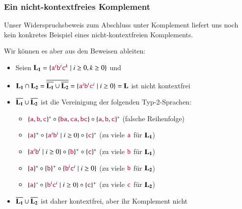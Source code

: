 \documentclass[aspectratio=1610,onlymath]{beamer}
\begin{document}
\begin{frame}\frametitle{Ein nicht-kontextfreies Komplement}

Unser Widerspruchsbeweis zum Abschluss unter Komplement liefert uns noch kein 
konkretes Beispiel eines nicht-kontextfreien Komplements.\pause
\medskip

Wir können es aber aus den Beweisen ableiten:
\begin{itemize}
\item Seien $\Slangsub{L}{1}=\{\Sterm{a}^i\Sterm{b}^i\Sterm{c}^k\mid i\geq 0, k\geq 0\}$ 
und 
%
\item $\Slangsub{L}{1}\cap\Slangsub{L}{2}=\overline{\overline{\Slangsub{L}{1}}\cup\overline{\Slangsub{L}{2}}}=\{\Sterm{a}^i\Sterm{b}^i\Sterm{c}^i\mid i\geq 0\}=\Slang{L}$ ist nicht kontextfrei\pause
%
\item $\overline{\Slangsub{L}{1}}\cup\overline{\Slangsub{L}{2}}$ ist die Vereinigung der folgenden Typ-2-Sprachen:
\begin{itemize}
\item $\{\Sterm{a},\Sterm{b},\Sterm{c}\}^*\circ\{\Sterm{ba},\Sterm{ca},\Sterm{bc}\}\circ\{\Sterm{a},\Sterm{b},\Sterm{c}\}^*$ (falsche Reihenfolge)
\item $\{\Sterm{a}\}^+\circ \{\Sterm{a}^i\Sterm{b}^i\mid i\geq 0\}\circ\{\Sterm{c}\}^*$ \hspace{1.25cm}(zu viele $\Sterm{a}$ für $\Slangsub{L}{1}$)
\item $\{\Sterm{a}^i\Sterm{b}^i\mid i\geq 0\}\circ\{\Sterm{b}\}^+\circ\{\Sterm{c}\}^*$ \hspace{1.25cm}(zu viele $\Sterm{b}$ für $\Slangsub{L}{1}$)
\item $\{\Sterm{a}\}^*\circ\{\Sterm{b}\}^+\circ \{\Sterm{b}^i\Sterm{c}^i\mid i\geq 0\}$ \hspace{1.25cm}(zu viele $\Sterm{b}$ für $\Slangsub{L}{2}$)
\item $\{\Sterm{a}\}^*\circ \{\Sterm{b}^i\Sterm{c}^i\mid i\geq 0\}\circ\{\Sterm{c}\}^+$  \hspace{1.25cm}(zu viele $\Sterm{c}$ für $\Slangsub{L}{2}$)
\end{itemize}
%
\item $\overline{\Slangsub{L}{1}}\cup\overline{\Slangsub{L}{2}}$ ist daher kontextfrei, aber ihr Komplement nicht
\end{itemize}


\end{frame}
\end{document}
